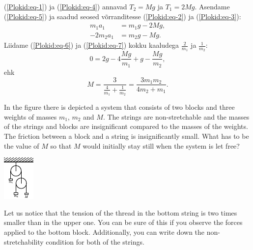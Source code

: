 {(\ref{Plokid:eq-1}) ja (\ref{Plokid:eq-4}) annavad $T_2 = Mg$ ja $T_1 = 2Mg$. Asendame (\ref{Plokid:eq-5}) ja saadud seosed võrranditesse (\ref{Plokid:eq-2}) ja (\ref{Plokid:eq-3}):
\begin{align}
m_1a_1 &= m_1g - 2Mg, \label{Plokid:eq-6}\\
-2m_2a_1 &= m_2g - Mg. \label{Plokid:eq-7}
\end{align}
Liidame (\ref{Plokid:eq-6}) ja (\ref{Plokid:eq-7}) kokku kaaludega $\frac{2}{m_1}$ ja $\frac{1}{m_2}$:
\[
0 = 2g - 4\frac{Mg}{m_1} + g - \frac{Mg}{m_2},
\]
ehk
\[
M = \frac{3}{\frac{4}{m_1} + \frac{1}{m_2}} = \frac{3m_1m_2}{4m_2 + m_1}.
\]
\fi


\ifEngStatement
In the figure there is depicted a system that consists of two blocks and three weights of masses $m_1$, $m_2$ and $M$. The strings are non-stretchable and the masses of the strings and blocks are insignificant compared to the masses of the weights. The friction between a block and a string is insignificantly small. What has to be the value of $M$ so that $M$ would initially stay still when the system is let free?
\begin{center}
	\includegraphics[width = 0.3\linewidth]  {2017-lahg-08-double_pulleys_img.pdf}
\end{center}
\fi


\ifEngHint
Let us notice that the tension of the thread in the bottom string is two times smaller than in the upper one. You can be sure of this if you observe the forces applied to the bottom block. Additionally, you can write down the non-stretchability condition for both of the strings.
\fi


}
